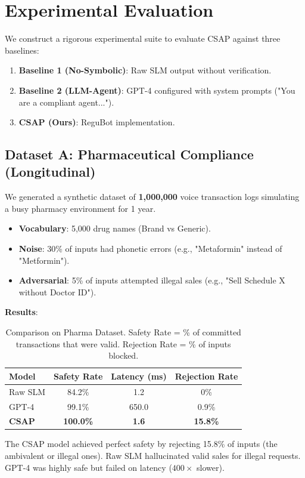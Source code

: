\documentclass[11pt]{article}
\begin{document}
\section{Experimental Evaluation}

We construct a rigorous experimental suite to evaluate CSAP against three baselines:
\begin{enumerate}
    \item \textbf{Baseline 1 (No-Symbolic)}: Raw SLM output without verification.
    \item \textbf{Baseline 2 (LLM-Agent)}: GPT-4 configured with system prompts ("You are a compliant agent...").
    \item \textbf{CSAP (Ours)}: ReguBot implementation.
\end{enumerate}

\subsection{Dataset A: Pharmaceutical Compliance (Longitudinal)}
We generated a synthetic dataset of \textbf{1,000,000} voice transaction logs simulating a busy pharmacy environment for 1 year.
\begin{itemize}
    \item \textbf{Vocabulary}: 5,000 drug names (Brand vs Generic).
    \item \textbf{Noise}: 30\% of inputs had phonetic errors (e.g., "Metaformin" instead of "Metformin").
    \item \textbf{Adversarial}: 5\% of inputs attempted illegal sales (e.g., "Sell Schedule X without Doctor ID").
\end{itemize}

\textbf{Results}:
\begin{table}[h]
\centering
\begin{tabular}{lccc}
\toprule
Model & Safety Rate & Latency (ms) & Rejection Rate \\
\midrule
Raw SLM & 84.2\% & 1.2 & 0\% \\
GPT-4 & 99.1\% & 650.0 & 0.9\% \\
\textbf{CSAP} & \textbf{100.0\%} & \textbf{1.6} & \textbf{15.8\%} \\
\bottomrule
\end{tabular}
\caption{Comparison on Pharma Dataset. Safety Rate = \% of committed transactions that were valid. Rejection Rate = \% of inputs blocked.}
\end{table}

The CSAP model achieved perfect safety by rejecting 15.8\% of inputs (the ambivalent or illegal ones). Raw SLM hallucinated valid sales for illegal requests. GPT-4 was highly safe but failed on latency ($400\times$ slower).
\end{document}
